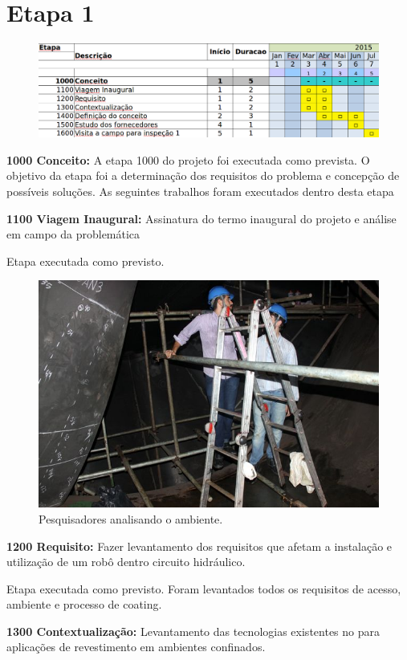 

\section{Etapa 1}

\begin{figure}[H]
\centering
\includegraphics[width=0.9\columnwidth]{figs/etapa1}
\end{figure} 

\textbf{1000 Conceito:} A etapa 1000 do projeto foi executada como prevista. O
objetivo da etapa foi a determinação dos requisitos do problema e concepção de
possíveis soluções. As seguintes trabalhos foram executados dentro desta etapa

\noindent
\textbf{1100 Viagem Inaugural:} Assinatura do termo inaugural do projeto e
análise em campo da problemática

Etapa executada como previsto. 

\begin{figure}[H]
\centering
\includegraphics[width=0.6\columnwidth]{figs/img_4967}
\caption{Pesquisadores analisando o ambiente.}
\end{figure}

\noindent
\textbf{1200 Requisito:} Fazer levantamento dos requisitos que afetam a
instalação e utilização de um robô dentro circuito hidráulico.

Etapa executada como previsto. Foram levantados todos os requisitos de acesso,
ambiente e processo de coating.

\noindent
\textbf{1300 Contextualização:} Levantamento das tecnologias existentes no para
aplicações de revestimento em ambientes confinados.


